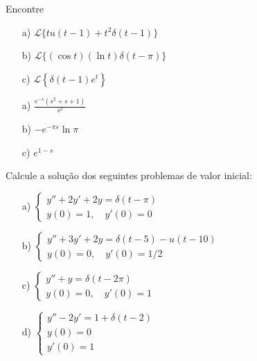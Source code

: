 \begin{exer}
Encontre
\begin{itemize}
  \item[a)] $\displaystyle \mathcal{L} \big\{ t u(t-1) + t^2 \delta(t-1) \big\}$
  \item[b)] $\displaystyle \mathcal{L} \big\{ (\cos t) ( \ln t ) \delta(t-\pi) \big\}$
  \item[c)] $\displaystyle \mathcal{L}\left\{ \delta(t-1) e^t \right\}$
\end{itemize}
\end{exer}
\begin{resp}
\begin{itemize}
  \item[a)] $\displaystyle \frac{ e^{-s} (s^2 + s + 1) }{s^2}$
  \item[b)] $\displaystyle -e^{-\pi s} \ln \pi $
  \item[c)] $\displaystyle e^{1-s}$
  \end{itemize}
\end{resp}
\begin{exer}
Calcule a solução dos seguintes problemas de valor inicial:
\begin{itemize}
  \item[a)] $\displaystyle \left\{
                              \begin{array}{ll}
                                y'' + 2y'+2y = \delta(t-\pi)\\
                                y(0) = 1, \quad y'(0)=0
                              \end{array}
                            \right.
  $
  \item[b)] $\displaystyle \left\{
                              \begin{array}{ll}
                                y'' + 3y'+2y = \delta(t-5) - u(t-10)\\
                                y(0) = 0, \quad y'(0)=1/2
                                \end{array}
                            \right.
  $
  \item[c)] $\displaystyle \left\{
                              \begin{array}{ll}
                                y'' + y = \delta(t-2\pi)\\
                                y(0) = 0, \quad y'(0)=1
                              \end{array}
                            \right.
  $
  \item[d)] $ \displaystyle \left\{\begin{array}{l}
   y''-2y'=1+\delta(t-2)\\
   y(0)=0\\
   y'(0)=1
  \end{array}\right.
 $
  
\end{itemize}
\end{exer}
